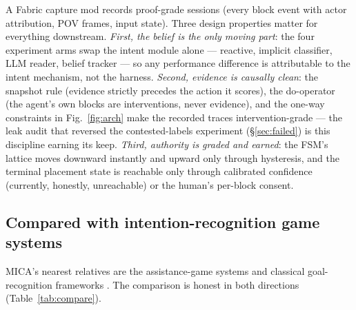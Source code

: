 \documentclass[11pt]{article}
\begin{document}
A Fabric capture mod records proof-grade sessions (every block event with
actor attribution, POV frames, input state). Three design properties matter
for everything downstream. \emph{First, the belief is the only moving part}:
the four experiment arms swap the intent module alone --- reactive, implicit
classifier, LLM reader, belief tracker --- so any performance difference is
attributable to the intent mechanism, not the harness. \emph{Second, evidence
is causally clean}: the snapshot rule (evidence strictly precedes the action
it scores), the do-operator (the agent's own blocks are interventions, never
evidence), and the one-way constraints in Fig.~\ref{fig:arch} make the
recorded traces intervention-grade --- the leak audit that reversed the
contested-labels experiment (\S\ref{sec:failed}) is this discipline earning
its keep. \emph{Third, authority is graded and earned}: the FSM's lattice
moves downward instantly and upward only through hysteresis, and the terminal
placement state is reachable only through calibrated confidence (currently,
honestly, unreachable) or the human's per-block consent.

\subsection{Compared with intention-recognition game systems}
\label{sec:compare}

MICA's nearest relatives are the assistance-game systems
\cite{assistancezero,wah,nopa} and classical goal-recognition frameworks
\cite{sips,clips}. The comparison is honest in both directions
(Table~\ref{tab:compare}).
\end{document}
